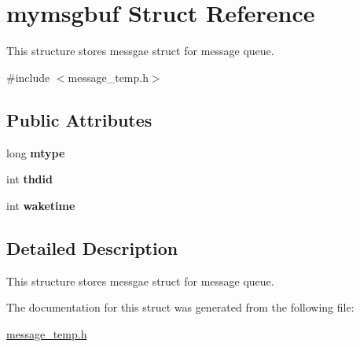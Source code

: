 \hypertarget{structmymsgbuf}{\section{mymsgbuf \-Struct \-Reference}
\label{structmymsgbuf}
}


\-This structure stores messgae struct for message queue.  




{\ttfamily \#include $<$message\-\_\-temp.\-h$>$}

\subsection*{\-Public \-Attributes}
\begin{DoxyCompactItemize}
\item 
\hypertarget{structmymsgbuf_a21ef64f89f1608c1f00ba90aaa2f05a9}{long {\bfseries mtype}}\label{structmymsgbuf_a21ef64f89f1608c1f00ba90aaa2f05a9}

\item 
\hypertarget{structmymsgbuf_a7df0ef235f6968e408aafe66b544a723}{int {\bfseries thdid}}\label{structmymsgbuf_a7df0ef235f6968e408aafe66b544a723}

\item 
\hypertarget{structmymsgbuf_aa85fd5c53a5192407d6f54e70065ea10}{int {\bfseries waketime}}\label{structmymsgbuf_aa85fd5c53a5192407d6f54e70065ea10}

\end{DoxyCompactItemize}


\subsection{\-Detailed \-Description}
\-This structure stores messgae struct for message queue. 

\-The documentation for this struct was generated from the following file\-:\begin{DoxyCompactItemize}
\item 
\hyperlink{message__temp_8h}{message\-\_\-temp.\-h}\end{DoxyCompactItemize}
